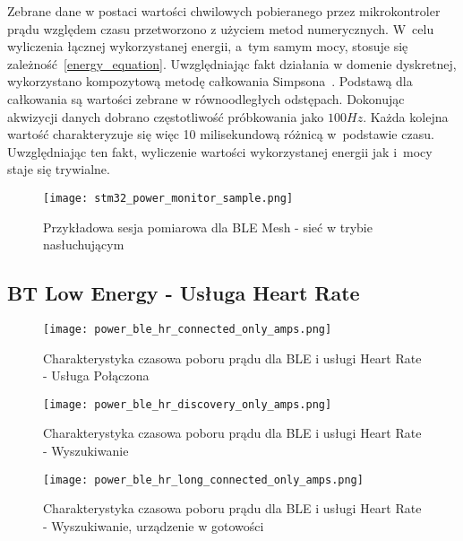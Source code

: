 Zebrane dane w postaci wartości chwilowych pobieranego przez mikrokontroler prądu względem czasu
przetworzono z użyciem metod numerycznych. W~celu wyliczenia łącznej wykorzystanej energii, a~tym samym
mocy, stosuje się zależność~\ref{energy_equation}. Uwzględniając fakt działania w domenie dyskretnej,
wykorzystano kompozytową metodę całkowania Simpsona~\cite{noauthor_scipyintegratesimpson_nodate}.
Podstawą dla całkowania są wartości zebrane w równoodległych odstępach. Dokonując akwizycji danych
dobrano częstotliwość próbkowania jako $100Hz$. Każda kolejna wartość charakteryzuje się więc
10 milisekundową różnicą w~podstawie czasu. Uwzględniając ten fakt, wyliczenie wartości
wykorzystanej energii jak i~mocy staje się trywialne.

\begin{figure}[!htb]
	\centering \texttt{[image: stm32\_power\_monitor\_sample.png]}
	\caption{Przykładowa sesja pomiarowa dla BLE Mesh - sieć w trybie nasłuchującym}
	\label{rys:measurement_session_sample}
\end{figure}

\subsection{BT Low Energy - Usługa Heart Rate}

\lipsum[1-3]
\begin{figure}[!htb]
	\centering \texttt{[image: power\_ble\_hr\_connected\_only\_amps.png]}
	\caption{Charakterystyka czasowa poboru prądu dla BLE i usługi Heart Rate - Usługa Połączona}
	\label{rys:power_ble_hr_connected_only_amps}
\end{figure}

\lipsum[1-3]
\begin{figure}[!htb]
	\centering \texttt{[image: power\_ble\_hr\_discovery\_only\_amps.png]}
	\caption{Charakterystyka czasowa poboru prądu dla BLE i usługi Heart Rate - Wyszukiwanie}
	\label{rys:power_ble_hr_discovery_only_amps}
\end{figure}

\lipsum[1-3]
\begin{figure}[!htb]
	\centering \texttt{[image: power\_ble\_hr\_long\_connected\_only\_amps.png]}
	\caption{Charakterystyka czasowa poboru prądu dla BLE i usługi Heart Rate - Wyszukiwanie, urządzenie w gotowości}
	\label{rys:power_ble_hr_long_connected_only_amps}
\end{figure}


